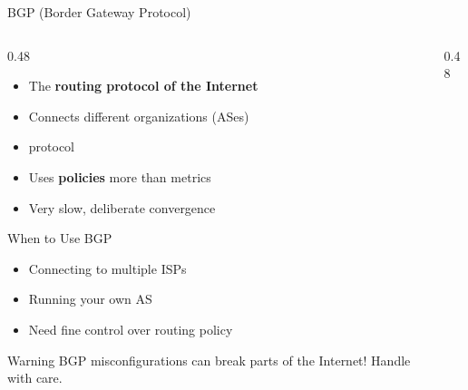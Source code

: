 \documentclass[aspectratio=169]{beamer}  %
\begin{document}
\begin{frame}{BGP (Border Gateway Protocol)}
    \begin{columns}[T]
        \begin{column}{0.48\textwidth}
            \begin{itemize}
                \item The \textbf{routing protocol of the Internet}
                \item Connects different organizations (ASes)
                \item {} protocol
                \item Uses \textbf{policies} more than metrics
                \item Very slow, deliberate convergence
            \end{itemize}
            
            \vspace{0.2em}
            \begin{block}{When to Use BGP}
                \small
                \begin{itemize}\setlength{\itemsep}{1pt}
                    \item Connecting to multiple ISPs
                    \item Running your own AS
                    \item Need fine control over routing policy
                \end{itemize}
            \end{block}
            
            \vspace{0.2em}
            \begin{alertblock}{Warning}
                \small
                BGP misconfigurations can break parts of the Internet! Handle with care.
            \end{alertblock}
        \end{column}
        \begin{column}{0.48\textwidth}
            \begin{center}
\end{center}
\end{column}
\end{columns}
\end{frame}
\end{document}
